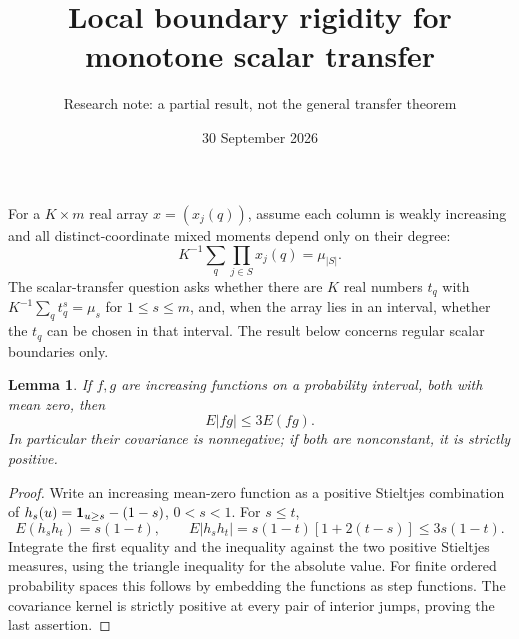 \documentclass[11pt]{article}
\title{Local boundary rigidity for monotone scalar transfer}
\author{Research note: a partial result, not the general transfer theorem}
\date{30 September 2026}
\newtheorem{lemma}{Lemma}
\begin{document}
\maketitle

For a $K\times m$ real array $x=(x_j(q))$, assume each column is weakly
increasing and all distinct-coordinate mixed moments depend only on their
degree:
\[
 K^{-1}\sum_q\prod_{j\in S}x_j(q)=\mu_{|S|}.
\]
The scalar-transfer question asks whether there are $K$ real numbers $t_q$
with $K^{-1}\sum_qt_q^s=\mu_s$ for $1\le s\le m$, and, when the array lies
in an interval, whether the $t_q$ can be chosen in that interval.
The result below concerns regular scalar boundaries only.

\begin{lemma}\label{abs}
If $f,g$ are increasing functions on a probability interval, both with
mean zero, then
\[
 E|fg|\le3E(fg).
\]
In particular their covariance is nonnegative; if both are nonconstant,
it is strictly positive.
\end{lemma}
\begin{proof}
Write an increasing mean-zero function as a positive Stieltjes combination
of $h_s(u)={\bf1}_{u\ge s}-(1-s)$, $0<s<1$. For $s\le t$,
\[
 E(h_sh_t)=s(1-t),\qquad
 E|h_sh_t|=s(1-t)[1+2(t-s)]\le3s(1-t).
\]
Integrate the first equality and the inequality against the two positive
Stieltjes measures, using the triangle inequality for the absolute value.
For finite ordered probability spaces this follows by embedding the
functions as step functions. The covariance kernel is strictly positive
at every pair of interior jumps, proving the last assertion.
\end{proof}
\end{document}
